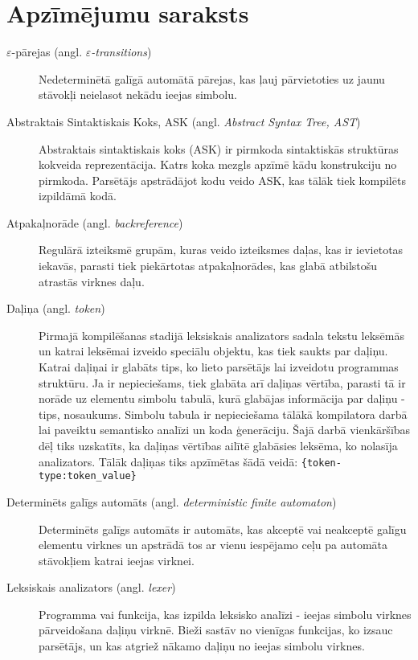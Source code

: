 \section*{Apzīmējumu saraksts}

\begin{description}
\item[$\varepsilon$-pārejas (angl. \emph{$\varepsilon$-transitions})]
Nedeterminētā galīgā automātā pārejas, kas ļauj pārvietoties uz jaunu stāvokļi neielasot nekādu ieejas simbolu.

\item[Abstraktais Sintaktiskais Koks, ASK (angl. \emph{Abstract Syntax Tree, AST})]
Abstraktais sintaktiskais koks (ASK) ir pirmkoda sintaktiskās struktūras kokveida reprezentācija. Katrs koka mezgls apzīmē kādu konstrukciju no pirmkoda. Parsētājs apstrādājot kodu veido ASK, kas tālāk tiek kompilēts izpildāmā kodā.

\item[Atpakaļnorāde (angl. \emph{backreference})]
Regulārā izteiksmē grupām, kuras veido izteiksmes daļas, kas ir ievietotas iekavās, parasti tiek piekārtotas atpakaļnorādes, kas glabā atbilstošu atrastās virknes daļu.

\item[Daļiņa (angl. \emph{token})]
Pirmajā kompilēšanas stadijā leksiskais analizators sadala tekstu leksēmās un katrai leksēmai izveido speciālu objektu, kas tiek saukts par daļiņu. Katrai daļiņai ir glabāts tips, ko lieto parsētājs lai izveidotu programmas struktūru. Ja ir nepieciešams, tiek glabāta arī daļiņas vērtība, parasti tā ir norāde uz elementu simbolu tabulā, kurā glabājas informācija par daļiņu - tips, nosaukums. Simbolu tabula ir nepieciešama tālākā kompilatora darbā lai paveiktu semantisko analīzi un koda ģenerāciju. Šajā darbā vienkāršības dēļ tiks uzskatīts, ka daļiņas vērtības ailītē glabāsies leksēma, ko nolasīja analizators. Tālāk daļiņas tiks apzīmētas šādā veidā: \texttt{\{token-type:token\_value\}}

\item[Determinēts galīgs automāts (angl. \emph{deterministic finite automaton})]
Determinēts galīgs automāts ir automāts, kas akceptē vai neakceptē galīgu elementu virknes un apstrādā tos ar vienu iespējamo ceļu pa automāta stāvokļiem katrai ieejas virknei.~\cite{Hopcroft:IntroAutomataTheory}

\item[Leksiskais analizators (angl. \emph{lexer})]
Programma vai funkcija, kas izpilda leksisko analīzi - ieejas simbolu virknes pārveidošana daļiņu virknē. Bieži sastāv no vienīgas funkcijas, ko izsauc parsētājs, un kas atgriež nākamo daļiņu no ieejas simbolu virknes.


\end{description}
